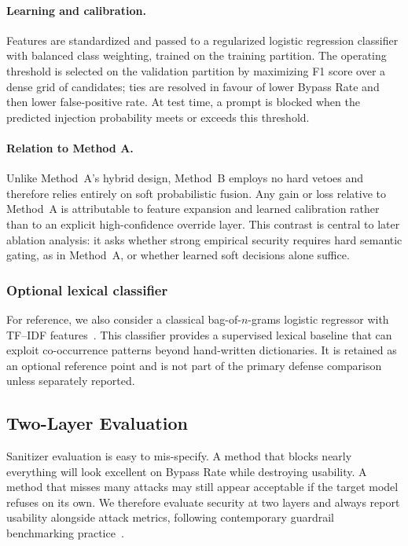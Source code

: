 \paragraph{Learning and calibration.}
Features are standardized and passed to a regularized logistic regression classifier with balanced class weighting, trained on the training partition.
The operating threshold is selected on the validation partition by maximizing F1 score over a dense grid of candidates; ties are resolved in favour of lower Bypass Rate and then lower false-positive rate.
At test time, a prompt is blocked when the predicted injection probability meets or exceeds this threshold.

\paragraph{Relation to Method A.}
Unlike Method~A's hybrid design, Method~B employs no hard vetoes and therefore relies entirely on soft probabilistic fusion.
Any gain or loss relative to Method~A is attributable to feature expansion and learned calibration rather than to an explicit high-confidence override layer.
This contrast is central to later ablation analysis: it asks whether strong empirical security requires hard semantic gating, as in Method~A, or whether learned soft decisions alone suffice.

\subsubsection{Optional lexical classifier}

For reference, we also consider a classical bag-of-\(n\)-grams logistic regressor with TF--IDF features~\cite{salton1988term}.
This classifier provides a supervised lexical baseline that can exploit co-occurrence patterns beyond hand-written dictionaries.
It is retained as an optional reference point and is not part of the primary defense comparison unless separately reported.

\subsection{Two-Layer Evaluation}
\label{sec:evaluation}

Sanitizer evaluation is easy to mis-specify.
A method that blocks nearly everything will look excellent on Bypass Rate while destroying usability.
A method that misses many attacks may still appear acceptable if the target model refuses on its own.
We therefore evaluate security at two layers and always report usability alongside attack metrics, following contemporary guardrail benchmarking practice~\cite{zizzo2025adversarial,promptfoo2024owasp}.

